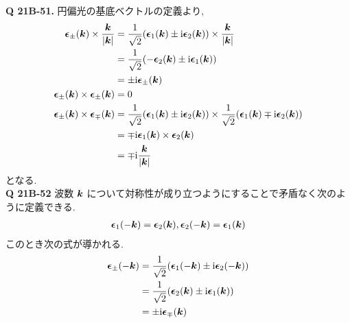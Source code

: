 \documentclass[uplatex,a4paper,dvipdfmx]{jsarticle}
\theoremstyle{definition}
\begin{document}
\textbf{Q 21B-51.}
円偏光の基底ベクトルの定義より,
\begin{align}
  \vb*{\epsilon}_\pm(\vb*{k})\times\frac{\vb*{k}}{|\vb*{k}|}
   & = \frac{1}{\sqrt{2}}\qty(\vb*{\epsilon}_1(\vb*{k}) \pm \mathrm{i}\vb*{\epsilon}_2(\vb*{k}))\times\frac{\vb*{k}}{|\vb*{k}|}                                    \\
   & = \frac{1}{\sqrt{2}}\qty(-\vb*{\epsilon}_2(\vb*{k}) \pm \mathrm{i}\vb*{\epsilon}_1(\vb*{k}))                                                          \\
   & = \pm\mathrm{i}\vb*{\epsilon}_\pm(\vb*{k})                                                                                             \\
  \vb*{\epsilon}_\pm(\vb*{k})\times\vb*{\epsilon}_\pm(\vb*{k})
   & = 0                                                                                                              \\
  \vb*{\epsilon}_\pm(\vb*{k})\times\vb*{\epsilon}_\mp(\vb*{k})
   & = \frac{1}{\sqrt{2}}\qty(\vb*{\epsilon}_1(\vb*{k}) \pm \mathrm{i}\vb*{\epsilon}_2(\vb*{k}))\times\frac{1}{\sqrt{2}}\qty(\vb*{\epsilon}_1(\vb*{k}) \mp \mathrm{i}\vb*{\epsilon}_2(\vb*{k})) \\
   & = \mp\mathrm{i}\vb*{\epsilon}_1(\vb*{k})\times\vb*{\epsilon}_2(\vb*{k})                                                                               \\
   & = \mp\mathrm{i}\frac{\vb*{k}}{|\vb*{k}|}
\end{align}
となる. \\

\textbf{Q 21B-52}
波数 $\vb*{k}$ について対称性が成り立つようにすることで矛盾なく次のように定義できる.
\begin{align}
  \vb*{\epsilon}_1(-\vb*{k}) = \vb*{\epsilon}_2(\vb*{k}), \vb*{\epsilon}_2(-\vb*{k}) = \vb*{\epsilon}_1(\vb*{k})
\end{align}
このとき次の式が導かれる.
\begin{align}
  \vb*{\epsilon}_\pm(-\vb*{k}) & = \frac{1}{\sqrt{2}}\qty(\vb*{\epsilon}_1(-\vb*{k})\pm\mathrm{i}\vb*{\epsilon}_2(-\vb*{k})) \\
                & = \frac{1}{\sqrt{2}}\qty(\vb*{\epsilon}_2(\vb*{k})\pm\mathrm{i}\vb*{\epsilon}_1(\vb*{k}))   \\
                & = \pm\mathrm{i}\vb*{\epsilon}_\mp(\vb*{k})
\end{align}
\end{document}
